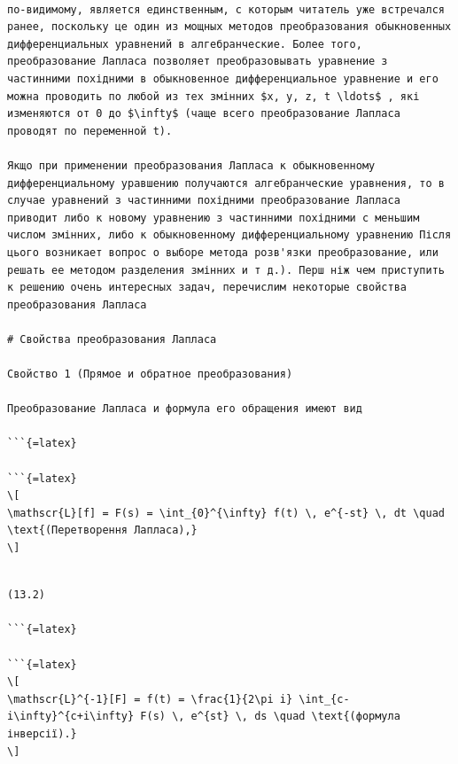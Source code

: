 \documentclass[
]{article}
\begin{document}
\begin{verbatim}

по-видимому, является единственным, с которым читатель уже встречался ранее, поскольку це один из мощных методов преобразования обыкновенных дифференциальных уравнений в алгебранческие. Более того, преобразование Лапласа позволяет преобразовывать уравнение з частинними похідними в обыкновенное дифференциальное уравнение и его можна проводить по любой из тех змінних $x, y, z, t \ldots$ , які изменяются от 0 до $\infty$ (чаще всего преобразование Лапласа проводят по переменной t).

Якщо при применении преобразования Лапласа к обыкновенному дифференциальному уравшению получаются алгебранческие уравнения, то в случае уравнений з частинними похідними преобразование Лапласа приводит либо к новому уравнению з частинними похідними с меньшим числом змінних, либо к обыкновенному дифференциальному уравнению Після цього возникает вопрос о выборе метода розв'язки преобразование, или решать ее методом разделения змінних и т д.). Перш ніж чем приступить к решению очень интересных задач, перечислим некоторые свойства преобразования Лапласа

# Свойства преобразования Лапласа

Свойство 1 (Прямое и обратное преобразования)

Преобразование Лапласа и формула его обращения имеют вид

```{=latex}

```{=latex}
\[
\mathscr{L}[f] = F(s) = \int_{0}^{\infty} f(t) \, e^{-st} \, dt \quad \text{(Перетворення Лапласа),}
\]
\end{verbatim}

\begin{verbatim}

(13.2)

```{=latex}

```{=latex}
\[
\mathscr{L}^{-1}[F] = f(t) = \frac{1}{2\pi i} \int_{c-i\infty}^{c+i\infty} F(s) \, e^{st} \, ds \quad \text{(формула інверсії).}
\]
\end{verbatim}
\end{document}
